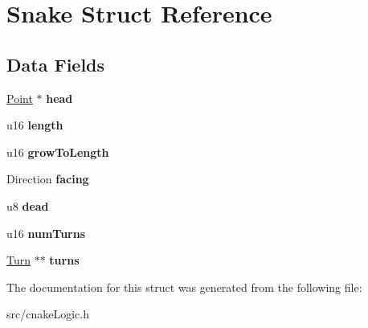 \hypertarget{struct_snake}{}\section{Snake Struct Reference}
\label{struct_snake}
\subsection*{Data Fields}
\begin{DoxyCompactItemize}
\item 
\hyperlink{struct_point}{Point} $\ast$ {\bfseries head}\hypertarget{struct_snake_accdccb4805540fdd3b0380f2f3ed5796}{}\label{struct_snake_accdccb4805540fdd3b0380f2f3ed5796}

\item 
u16 {\bfseries length}\hypertarget{struct_snake_a205e2b97fe60d899412ca79655cc064c}{}\label{struct_snake_a205e2b97fe60d899412ca79655cc064c}

\item 
u16 {\bfseries grow\+To\+Length}\hypertarget{struct_snake_ad7b38e6e181a7fc796cdb9dded9878d9}{}\label{struct_snake_ad7b38e6e181a7fc796cdb9dded9878d9}

\item 
Direction {\bfseries facing}\hypertarget{struct_snake_a8353069dfd601a3f9aa2fef0a15cd5fd}{}\label{struct_snake_a8353069dfd601a3f9aa2fef0a15cd5fd}

\item 
u8 {\bfseries dead}\hypertarget{struct_snake_a2b2f605b873a12656757f595ce3ed659}{}\label{struct_snake_a2b2f605b873a12656757f595ce3ed659}

\item 
u16 {\bfseries num\+Turns}\hypertarget{struct_snake_a4bff3104a813408b17c1f687e1461f81}{}\label{struct_snake_a4bff3104a813408b17c1f687e1461f81}

\item 
\hyperlink{struct_turn}{Turn} $\ast$$\ast$ {\bfseries turns}\hypertarget{struct_snake_af820fd5b127c523ce57ad98829dfe29f}{}\label{struct_snake_af820fd5b127c523ce57ad98829dfe29f}

\end{DoxyCompactItemize}


The documentation for this struct was generated from the following file\+:\begin{DoxyCompactItemize}
\item 
src/cnake\+Logic.\+h\end{DoxyCompactItemize}
